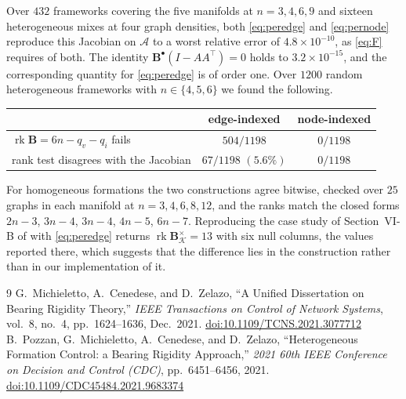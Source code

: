 \documentclass[11pt,a4paper]{article}
\theoremstyle{plain}
\theoremstyle{definition}
\newcommand{\rank}{\operatorname{rk}}
\newcommand{\Bper}{\mathbf{B}^{\times}}
\newcommand{\Bnode}{\mathbf{B}^{\bullet}}
\begin{document}
Over $432$ frameworks covering the five manifolds at $n=3,4,6,9$ and sixteen
heterogeneous mixes at four graph densities, both \eqref{eq:peredge} and
\eqref{eq:pernode} reproduce this Jacobian on $\mathcal A$ to a worst relative
error of $4.8\times10^{-10}$, as \eqref{eq:F} requires of both. The identity
$\Bnode(I-AA^\top)=0$ holds to $3.2\times10^{-15}$, and the corresponding
quantity for \eqref{eq:peredge} is of order one. Over $1200$ random
heterogeneous frameworks with $n\in\{4,5,6\}$ we found the following.

\begin{center}
\begin{tabular}{lcc}
\toprule
 & edge-indexed & node-indexed\\
\midrule
$\rank\mathbf B=6n-q_v-q_i$ fails
    & $504/1198$
    & $0/1198$\\
rank test disagrees with the Jacobian
    & $67/1198$ $(5.6\%)$
    & $0/1198$\\
\bottomrule
\end{tabular}
\end{center}

For homogeneous formations the two constructions agree bitwise, checked over
$25$ graphs in each manifold at $n=3,4,6,8,12$, and the ranks match the closed
forms $2n-3$, $3n-4$, $3n-4$, $4n-5$, $6n-7$. Reproducing the case study of
Section~VI-B of \cite{michieletto2021} with \eqref{eq:peredge} returns
$\rank\Bper_{\mathcal K}=13$ with six null columns, the values reported
there, which suggests that the difference lies in the construction rather than
in our implementation of it.

\begin{thebibliography}{9}
G.~Michieletto, A.~Cenedese, and D.~Zelazo,
``A Unified Dissertation on Bearing Rigidity Theory,''
\emph{IEEE Transactions on Control of Network Systems}, vol.~8, no.~4,
pp.~1624--1636, Dec.~2021.
\href{https://doi.org/10.1109/TCNS.2021.3077712}{doi:10.1109/TCNS.2021.3077712}
B.~Pozzan, G.~Michieletto, A.~Cenedese, and D.~Zelazo,
``Heterogeneous Formation Control: a Bearing Rigidity Approach,''
\emph{2021 60th IEEE Conference on Decision and Control (CDC)},
pp.~6451--6456, 2021.
\href{https://doi.org/10.1109/CDC45484.2021.9683374}{doi:10.1109/CDC45484.2021.9683374}
\end{thebibliography}
\end{document}
